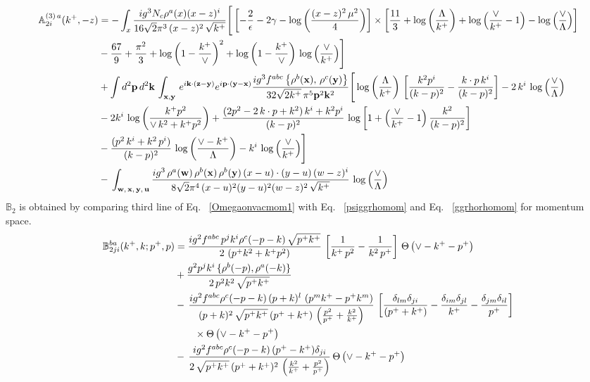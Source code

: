 \documentclass[aps,prd,amsmath,amssymb,nofootinbib]{revtex4-2}
\def\mf#1{\mathbb{#1}}
\def\v#1{\mathbf{#1}}
\numberwithin{equation}{section}
\begin{document}
\begin{align}
   \mf{A}^{(3)\,a}_{2i}(k^{+},-z)  & =  -\int_{x} \frac{ig^{3}N_{c}\rho^{a}(x)(x-z)^{i}}{16\sqrt{2}\pi^{3}\,(x-z)^{2}\,\sqrt{k^{+}}}\Bigg[\left[-\frac{2}{\epsilon}-2\gamma -\log{\left(\frac{(x-z)^{2}\,\mu^{2}}{4}\right)}\right]\times \left[\frac{11}{3}+ \log{\left(\frac{\Lambda}{k^{+}}\right)}+\log{\left(\frac{\vee}{k^{+}}-1\right)}-\log{\left(\frac{\vee}{\Lambda}\right)}\right]\notag \\ & -\frac{67}{9}+\frac{\pi^{2}}{3} + \log{\left(1-\frac{k^{+}}{\vee}\right)}^{2}+\log{\left(1-\frac{k^{+}}{\vee}\right)}\,\log{\left(\frac{\vee}{k^{+}}\right)}\Bigg] \notag \\ & +\int d^{2}\mathbf{p}\,d^{2}\mathbf{k}\,\int_{\v{x},\v{y}}\, e^{i\v{k}\cdot (\v{z}-\v{y})} e^{i\v{p}\cdot (\v{y}-\v{x})}\frac{ig^{3}f^{abc}\left\{ \rho^{b}(\mathbf{x}),\,\rho^{c}(\mathbf{y})\right\}}{32\sqrt{2k^{+}}\,\pi^{5}\mathbf{p}^{2}\mathbf{k}^{2}}\Bigg[\log{\left(\frac{\Lambda}{k^{+}}\right)}\,\left[\frac{k^{2}p^{i}}{(k-p)^{2}}-\frac{k\cdot p\,k^{i}}{(k-p)^{2}}\right]-2\,k^{i}\,\log{\left(\frac{\vee}{\Lambda}\right)}\notag \\ & -2k^{i}\,\log{\left(\frac{k^{+}p^{2}}{\vee\, k^{2}+k^{+}p^{2}}\right)}+\frac{(2p^{2}-2\,k\cdot p + k^{2})\,k^{i} + k^{2}p^{i}}{(k-p)^{2}}\, \log{\left[1+\left(\frac{\vee}{k^{+}}-1\right)\frac{k^{2}}{(k-p)^{2}}\right]}\notag \\ & - \frac{(p^{2}\,k^{i}+k^{2}\,p^{i})}{(k-p)^{2}}\, \log{\left(\frac{\vee - k^{+}}{\Lambda}\right)}-k^{i}\, \log{\left(\frac{\vee}{k^{+}}\right)}\Bigg]\notag \\ & -\,\int_{\mathbf{w},\, \mathbf{x},\, \mathbf{y},\, \mathbf{u}}\frac{ig^{3}\,\rho^{a}(\mathbf{w})\,\rho^{b}(\mathbf{x})\,\rho^{b}(\mathbf{y})\, (x-u)\cdot (y-u)\,(w-z)^{i}}{8\sqrt{2}\pi^{4}\,(x-u)^{2}(y-u)^{2}(w-z)^{2}\,\sqrt{k^{+}}}\,\log{\left(\frac{\vee}{\Lambda}\right)}
\end{align}
$\mf{B}_{2}$ is obtained by comparing third line of Eq.~ \eqref{Omegaonvacmom1} with Eq.~ \eqref{psiggrhomom} and Eq.~ \eqref{ggrhorhomom} for momentum space.
\begin{align}
    \mf{B}^{ba}_{2ji}(k^{+},k;p^{+},p) & =  \frac{ig^{2}f^{abc}\,p^{j}k^{i}\rho^{c}(-p-k)\, \sqrt{p^{+}k^{+}}}{2\,\left(p^{+}k^{2}+k^{+}p^{2}\right)}\,\left[\frac{1}{k^{+}\,p^{2}} - \frac{1}{k^{2}\,p^{+}}\right]\,\Theta\left(\vee-k^{+}-p^{+}\right)\notag \\ & + \frac{g^{2}p^{j}k^{i}\,\{\rho^{b}(-p),\rho^{a}(-k)\}}{2\,p^{2}k^{2}\, \sqrt{p^{+}k^{+}}}\notag \\ & -\,\frac{ig^{2}f^{abc}\rho^{c}(-p-k)\,(p+k)^{l}\,\left(p^{m}k^{+}-p^{+}k^{m}\right)}{(p+k)^{2}\,\sqrt{p^{+}k^{+}}\,(p^{+}+k^{+})\,\left(\frac{p^{2}}{p^{+}}+\frac{k^{2}}{k^{+}}\right)}\,\left[\frac{\delta_{lm}\delta_{ji}}{(p^{+}+k^{+})} - \frac{\delta_{im}\delta_{jl}}{k^{+}} - \frac{\delta_{jm}\delta_{il}}{p^{+}}\right]\notag \\ & \qquad\times\Theta\left(\vee-k^{+}-p^{+}\right)\notag \\ & -\,\frac{ig^{2}f^{abc}\rho^{c}(-p-k)\,(p^{+}-k^{+})\delta_{ji}}{2\,\sqrt{p^{+}k^{+}}\,(p^{+}+k^{+})^{2}\,\left(\frac{k^{2}}{k^{+}}+\frac{p^{2}}{p^{+}}\right)}\,\Theta\left(\vee-k^{+}-p^{+}\right)
\end{align}
\end{document}
